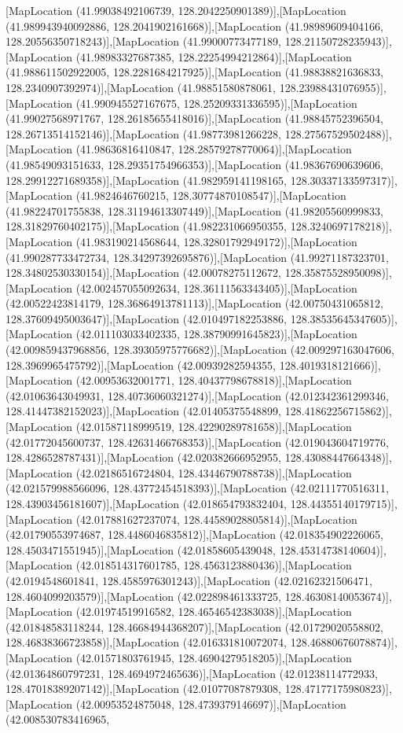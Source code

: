 [MapLocation (41.99038492106739, 128.2042250901389)],[MapLocation (41.989943940092886, 128.2041902161668)],[MapLocation (41.98989609404166, 128.20556350718243)],[MapLocation (41.99000773477189, 128.21150728235943)],[MapLocation (41.98983327687385, 128.22254994212864)],[MapLocation (41.988611502922005, 128.2281684217925)],[MapLocation (41.98838821636833, 128.2340907392974)],[MapLocation (41.98851580878061, 128.23988431076955)],[MapLocation (41.990945527167675, 128.25209331336595)],[MapLocation (41.99027568971767, 128.26185655418016)],[MapLocation (41.98845752396504, 128.26713514152146)],[MapLocation (41.98773981266228, 128.27567529502488)],[MapLocation (41.98636816410847, 128.28579278770064)],[MapLocation (41.98549093151633, 128.29351754966353)],[MapLocation (41.98367690639606, 128.29912271689358)],[MapLocation (41.982959141198165, 128.30337133597317)],[MapLocation (41.9824646760215, 128.30774870108547)],[MapLocation (41.98224701755838, 128.31194613307449)],[MapLocation (41.98205560999833, 128.31829760402175)],[MapLocation (41.982231066950355, 128.3240697178218)],[MapLocation (41.983190214568644, 128.32801792949172)],[MapLocation (41.990287733472734, 128.34297392695876)],[MapLocation (41.99271187323701, 128.34802530330154)],[MapLocation (42.00078275112672, 128.35875528950098)],[MapLocation (42.002457055092634, 128.36111563343405)],[MapLocation (42.00522423814179, 128.36864913781113)],[MapLocation (42.00750431065812, 128.37609495003647)],[MapLocation (42.010497182253886, 128.38535645347605)],[MapLocation (42.011103033402335, 128.38790991645823)],[MapLocation (42.009859437968856, 128.39305975776682)],[MapLocation (42.009297163047606, 128.3969965475792)],[MapLocation (42.00939282594355, 128.4019318121666)],[MapLocation (42.00953632001771, 128.40437798678818)],[MapLocation (42.01063643049931, 128.40736060321274)],[MapLocation (42.012342361299346, 128.41447382152023)],[MapLocation (42.01405375548899, 128.41862256715862)],[MapLocation (42.01587118999519, 128.42290289781658)],[MapLocation (42.01772045600737, 128.42631466768353)],[MapLocation (42.019043604719776, 128.4286528787431)],[MapLocation (42.020382666952955, 128.43088447664348)],[MapLocation (42.02186516724804, 128.43446790788738)],[MapLocation (42.021579988566096, 128.43772454518393)],[MapLocation (42.02111770516311, 128.43903456181607)],[MapLocation (42.018654793832404, 128.44355140179715)],[MapLocation (42.017881627237074, 128.44589028805814)],[MapLocation (42.01790553974687, 128.4486046835812)],[MapLocation (42.018354902226065, 128.4503471551945)],[MapLocation (42.01858605439048, 128.45314738140604)],[MapLocation (42.018514317601785, 128.4563123880436)],[MapLocation (42.0194548601841, 128.4585976301243)],[MapLocation (42.02162321506471, 128.4604099203579)],[MapLocation (42.022898461333725, 128.46308140053674)],[MapLocation (42.01974519916582, 128.46546542383038)],[MapLocation (42.01848583118244, 128.46684944368207)],[MapLocation (42.01729020558802, 128.46838366723858)],[MapLocation (42.016331810072074, 128.46880676078874)],[MapLocation (42.01571803761945, 128.46904279518205)],[MapLocation (42.01364860797231, 128.4694972465636)],[MapLocation (42.01238114772933, 128.47018389207142)],[MapLocation (42.01077087879308, 128.47177175980823)],[MapLocation (42.00953524875048, 128.4739379146697)],[MapLocation (42.008530783416965, 